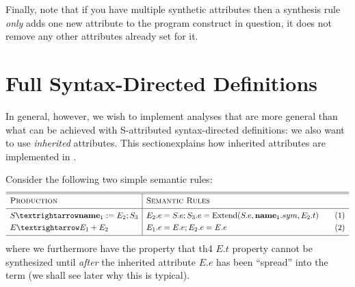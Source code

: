 \documentclass[11pt]{article} %
\begin{document}
Finally, note that if you have multiple synthetic attributes then a synthesis rule \emph{only} adds
one new attribute to the program construct in question, it does not remove any other attributes
already set for it.


\section{Full Syntax-Directed Definitions}
\label{sec:sdd}

In general, however, we wish to implement analyses that are more general than what can be achieved
with S-attributed syntax-directed definitions: we also want to use \emph{inherited} attributes.
This sectionexplains how inherited attributes are implemented in \HAX.

Consider the following two simple semantic rules:
\begin{equation*}
  \begin{array}{l|ll}
    \hline
    \hline
    \textsc{Production}  & \textsc{Semantic Rules} \Bigstrut&\\
    \hline
    S → \textbf{name}_1 := E_2; S_3
    &
    E_2.e = S.e; 
    S_3.e = \op{Extend}(S.e, \textbf{name}_1.sym, E_2.t) \Bigstrut\quad
    &\thetag{1}
    \\[\jot]
    E → E_1 + E_2
    &
    E_1.e = E.e; E_2.e = E.e
    &\thetag{2}
    \\[\jot]
    \hline
  \end{array}
\end{equation*}
where we furthermore have the property that th4 $E.t$ property cannot be synthesized until
\emph{after} the inherited attribute $E.e$ has been ``spread'' into the term (we shall see later why
this is typical).
\end{document}
